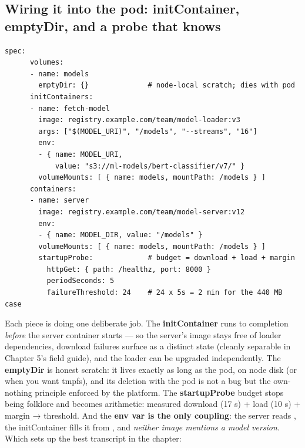\subsection*{Wiring it into the pod: initContainer, emptyDir, and a probe that knows}

\begin{terminalbox}
\begin{Verbatim}[breaklines=true,breakanywhere=true,fontsize=\small,formatcom=\color{tbbtermfg},codes=\tbbcodeactive]
    spec:
      volumes:
      - name: models
        emptyDir: {}              # node-local scratch; dies with pod
      initContainers:
      - name: fetch-model
        image: registry.example.com/team/model-loader:v3
        args: ["$(MODEL_URI)", "/models", "--streams", "16"]
        env:
        - { name: MODEL_URI,
            value: "s3://ml-models/bert-classifier/v7/" }
        volumeMounts: [ { name: models, mountPath: /models } ]
      containers:
      - name: server
        image: registry.example.com/team/model-server:v12
        env:
        - { name: MODEL_DIR, value: "/models" }
        volumeMounts: [ { name: models, mountPath: /models } ]
        startupProbe:             # budget = download + load + margin
          httpGet: { path: /healthz, port: 8000 }
          periodSeconds: 5
          failureThreshold: 24    # 24 x 5s = 2 min for the 440 MB case
\end{Verbatim}
\end{terminalbox}

Each piece is doing one deliberate job. The \textbf{initContainer} runs to completion \textit{before} the server container starts — so the server's image stays free of loader dependencies, download failures surface as a distinct  state (cleanly separable in Chapter 5's field guide), and the loader can be upgraded independently. The \textbf{emptyDir} is honest scratch: it lives exactly as long as the pod, on node disk (or  when you want tmpfs), and its deletion with the pod is not a bug but the own-nothing principle enforced by the platform. The \textbf{startupProbe} budget stops being folklore and becomes arithmetic: measured download (17 s) + load (10 s) + margin → threshold. And the \textbf{env var is the only coupling}: the server reads , the initContainer fills it from , and \textit{neither image mentions a model version}. Which sets up the best transcript in the chapter:

